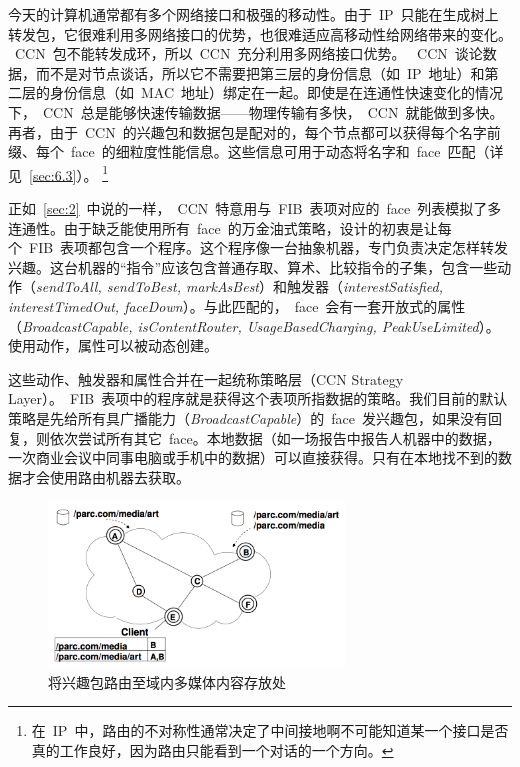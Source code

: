 今天的计算机通常都有多个网络接口和极强的移动性。由于~IP~只能在生成树上转发包，它很难利用多网络接口的优势，也很难适应高移动性给网络带来的变化。%
~CCN~包不能转发成环，所以~CCN~充分利用多网络接口优势。%
~CCN~谈论数据，而不是对节点谈话，所以它不需要把第三层的身份信息（如~IP~地址）和第二层的身份信息（如~MAC~地址）绑定在一起。即使是在连通性快速变化的情况下，~CCN~总是能够快速传输数据——物理传输有多快，~CCN~就能做到多快。再者，由于~CCN~的兴趣包和数据包是配对的，每个节点都可以获得每个名字前缀、每个~face~的细粒度性能信息。这些信息可用于动态将名字和~face~匹配（详见~\ref{sec:6.3}）。
\renewcommand\baselinestretch{1} %
\footnote{在~IP~中，路由的不对称性通常决定了中间接地啊不可能知道某一个接口是否真的工作良好，因为路由只能看到一个对话的一个方向。}

正如~\ref{sec:2}~中说的一样，~CCN~特意用与~FIB~表项对应的~face~列表模拟了多连通性。由于缺乏能使用所有~face~的万金油式策略，设计的初衷是让每个~FIB~表项都包含一个程序。这个程序像一台抽象机器，专门负责决定怎样转发兴趣。这台机器的“指令”应该包含普通存取、算术、比较指令的子集，包含一些动作（\emph{sendToAll, sendToBest, markAsBest}）和触发器（\emph{interestSatisfied, interestTimedOut, faceDown}）。与此匹配的，~face~会有一套开放式的属性（\emph{BroadcastCapable, isContentRouter, UsageBasedCharging, PeakUseLimited}）。使用动作，属性可以被动态创建。

这些动作、触发器和属性合并在一起统称策略层（CCN Strategy Layer）。~FIB~表项中的程序就是获得这个表项所指数据的策略。我们目前的默认策略是先给所有具广播能力（\emph{BroadcastCapable}）的~face~发兴趣包，如果没有回复，则依次尝试所有其它~face。本地数据（如一场报告中报告人机器中的数据，一次商业会议中同事电脑或手机中的数据）可以直接获得。只有在本地找不到的数据才会使用路由机器去获取。

\begin{figure}[htbp]
\begin{center}
\includegraphics[width=0.7\textwidth]{images/routing}
\caption{将兴趣包路由至域内多媒体内容存放处}
\label{routing}
\end{center}
\end{figure}

